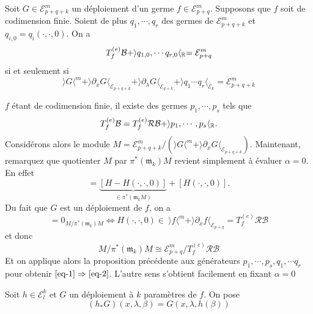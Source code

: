 \documentclass[memoire.tex]{subfiles}
\begin{document}
\begin{proposition}\label{Lemme-unif-depl}
    Soit $G\in\mathcal{E}^m_{p
    +q+k}$ un déploiement 
    d'un germe $f\in\mathcal
    {E}_{p+q}^m$. Supposons 
    que $f$ soit de 
    codimension finie. Soient 
    de plus $q_1,\cdots,q_r$ 
    des germes de $\mathcal{E}
    _{p+q+k}^m$ et $q_{i,0}
    =q_i(\cdot,\cdot,0)$.
    On a
    \begin{equation}\label{eq-1}
        T_f^{(e)}\mathcal{B}+\rangle q_{1,0},\cdots q_{r,0}\langle_{\mathbb{R}}=\mathcal{E}^m_{p+q}
    \end{equation}
    si et seulement si
    \begin{equation}\label{eq-2}
        \rangle G\langle^m+ 
        \rangle \partial_{x}G
        \langle_{\mathcal{E}_{p+q+k}} 
        +\rangle \partial_{\lambda}G
        \langle_{\mathcal{E}_{q+k}}
        +\rangle q_1 \cdots q_r\langle_{\mathcal{E}_{k}}=\mathcal{E}_{p+q+k}^m
    \end{equation}
\end{proposition}
\begin{preuve}
    $f$ étant de codimension finie, il existe des germes $p_1,\cdots,p_s$ tels que
    \begin{equation*}
        T^{(e)}_f\mathcal{B}=T^{(e)}_f\mathcal{RB}+\rangle p_1,\cdots,p_s\langle_{\mathbb{R}}.
    \end{equation*}
    Considérons alors le 
    module $M=\mathcal{E}^{m}_
    {p+q+k}/(\rangle 
    G\langle^m+ \rangle 
    \partial_x G\langle_
    {\mathcal{E}_{p+q+k}})$. 
    Maintenant, remarquez que quotienter $M$ par $\pi^{*}(\mathfrak{m}_k)M$ revient simplement à évaluer $\alpha=0$. En effet
    \begin{equation*}
        [H]
        =\underbrace{[H-H(\cdot,\cdot,0)]}_{\in\pi^{*}(\mathfrak{m}_kM)}+[H(\cdot,\cdot,0)].
    \end{equation*}
    Du fait que $G$ est un déploiement de $f$, on a
    \begin{equation*}
        [H]=0_{M/\pi^{*}(\mathfrak{m}_k)M}
        \Leftrightarrow H(\cdot,\cdot,0)\in\
    \rangle 
    f\langle^m+ \rangle 
    \partial_x f\langle_
    {\mathcal{E}_{p+q}}=T^{(e)}_f\mathcal{RB}
    \end{equation*}
    et donc
    \begin{equation*}
        M/\pi^{*}(\mathfrak{m}_k)M\cong \mathcal{E}^{m}_{p+q}/T^{(e)}_f\mathcal{RB}
    \end{equation*}
    Et on applique alors la proposition précédente aux générateurs $p_1,\cdots,p_s,q_1,\cdots q_r$ pour obtenir $\ref{eq-1}\Rightarrow \ref{eq-2}$. L'autre sens s'obtient facilement en fixant $\alpha=0$

\end{preuve}
Soit $h\in\mathcal{E}_{l}^k$ et $G$ un déploiement à $k$ paramètres de $f$. On pose
\begin{equation*}
    (h_{*}G)(x,\lambda,\beta)=
    G(x,\lambda,h(\beta))
\end{equation*}
\end{document}
